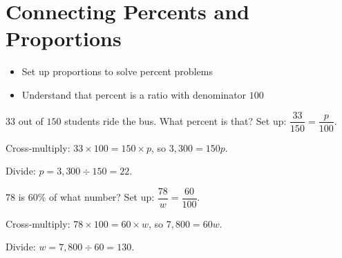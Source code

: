\section{Connecting Percents and Proportions}

\begin{stepGoal}
\begin{itemize}
    \item Set up proportions to solve percent problems
    \item Understand that percent is a ratio with denominator $100$
\end{itemize}
\end{stepGoal}

\begin{stepVocabBox}
\end{stepVocabBox}

\begin{stepsCard}
\end{stepsCard}

\begin{stepExample}{$33$ out of $150$ students ride the bus. What percent is that?}
     Set up: $\dfrac{33}{150} = \dfrac{p}{100}$.

     Cross-multiply: $33 \times 100 = 150 \times p$, so $3{,}300 = 150p$.

     Divide: $p = 3{,}300 \div 150 = 22$.
\end{stepExample}

\begin{stepExample}{$78$ is $60\%$ of what number?}
     Set up: $\dfrac{78}{w} = \dfrac{60}{100}$.

     Cross-multiply: $78 \times 100 = 60 \times w$, so $7{,}800 = 60w$.

     Divide: $w = 7{,}800 \div 60 = 130$.
\end{stepExample}


